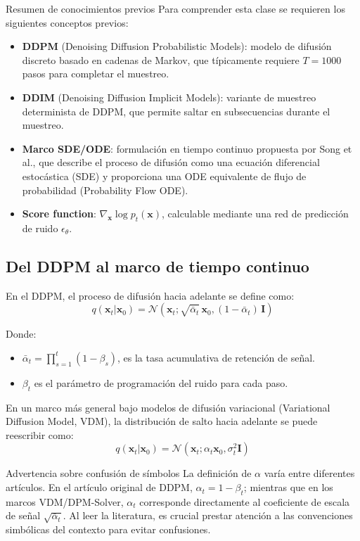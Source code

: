 \documentclass[a4paper]{article}
\begin{document}
\begin{knowledgebox}{Resumen de conocimientos previos}
Para comprender esta clase se requieren los siguientes conceptos previos:
\begin{itemize}
    \item \textbf{DDPM} (Denoising Diffusion Probabilistic Models): modelo de difusión discreto basado en cadenas de Markov, que típicamente requiere $T=1000$ pasos para completar el muestreo.
    \item \textbf{DDIM} (Denoising Diffusion Implicit Models): variante de muestreo determinista de DDPM, que permite saltar en subsecuencias durante el muestreo.
    \item \textbf{Marco SDE/ODE}: formulación en tiempo continuo propuesta por Song et al., que describe el proceso de difusión como una ecuación diferencial estocástica (SDE) y proporciona una ODE equivalente de flujo de probabilidad (Probability Flow ODE).
    \item \textbf{Score function}: $\nabla_{\mathbf{x}} \log p_t(\mathbf{x})$, calculable mediante una red de predicción de ruido $\epsilon_\theta$.
\end{itemize}
\end{knowledgebox}

\subsection{Del DDPM al marco de tiempo continuo}

En el DDPM, el proceso de difusión hacia adelante se define como:
$$q(\mathbf{x}_t | \mathbf{x}_0) = \mathcal{N}(\mathbf{x}_t; \sqrt{\bar{\alpha}_t}\, \mathbf{x}_0, (1 - \bar{\alpha}_t)\, \mathbf{I})$$

Donde:
\begin{itemize}
    \item $\bar{\alpha}_t = \prod_{s=1}^{t} (1 - \beta_s)$, es la tasa acumulativa de retención de señal.
    \item $\beta_t$ es el parámetro de programación del ruido para cada paso.
\end{itemize}

En un marco más general bajo modelos de difusión variacional (Variational Diffusion Model, VDM), la distribución de salto hacia adelante se puede reescribir como:
$$q(\mathbf{x}_t | \mathbf{x}_0) = \mathcal{N}(\mathbf{x}_t; \alpha_t \mathbf{x}_0, \sigma_t^2 \mathbf{I})$$

\begin{warningbox}{Advertencia sobre confusión de símbolos}
La definición de $\alpha$ varía entre diferentes artículos. En el artículo original de DDPM, $\alpha_t = 1 - \beta_t$; mientras que en los marcos VDM/DPM-Solver, $\alpha_t$ corresponde directamente al coeficiente de escala de señal $\sqrt{\bar{\alpha}_t}$. Al leer la literatura, es crucial prestar atención a las convenciones simbólicas del contexto para evitar confusiones.
\end{warningbox}
\end{document}
